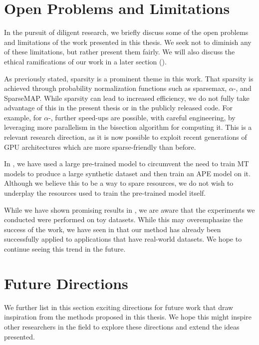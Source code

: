 \section{Open Problems and Limitations}

\noindent In the pursuit of diligent research, we briefly discuss some of the
open problems and limitations of the work presented in this thesis.
We seek not to diminish any of these limitations, but rather present
them fairly.
We will also discuss the ethical ramifications of our
work in a later section ().

As previously stated, sparsity is a prominent theme in this work.
That sparsity is achieved through probability normalization functions
such as sparsemax, $\alpha$-\entmaxtext, and SparseMAP. While
sparsity can lead to increased efficiency, we do not fully take
advantage of this in the present thesis or in the publicly released
code. For example, for $\alpha$-\entmaxtext, further speed-ups are
possible, with careful engineering, by leveraging more parallelism in
the bisection algorithm for computing it.
This is a relevant research direction, as it is now possible to
exploit recent generations of GPU architectures which are more
sparse-friendly than before.

In , we have used a large pre-trained model to
circumvent the need to train MT models to produce a large synthetic
dataset and then train an APE model on it. Although we believe
this to be a way to spare resources, we do not wish to underplay
the resources used to train the pre-trained model itself.

While we have shown promising results in ,
we are aware that the experiments we conducted were performed on toy
datasets. While this may overemphasize the success of the work, we
have seen in  that our method has already been
successfully applied to applications that have real-world datasets.
We hope to continue seeing this trend in the future.

\section{Future Directions}

\noindent We further list in this section exciting directions for future work
that draw inspiration from the methods proposed in this thesis. We
hope this might inspire other researchers in the field to explore
these directions and extend the ideas presented.

